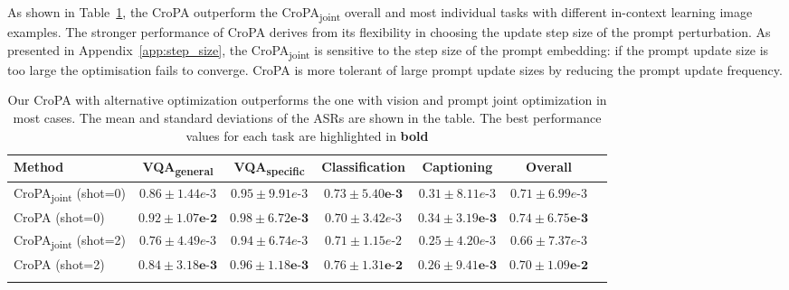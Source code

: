 As shown in Table~\ref{tab:alter_joint_comparision}, the CroPA outperform the CroPA\textsubscript{joint} overall and most individual tasks with different in-context learning image examples. The stronger performance of CroPA derives from its flexibility in choosing the update step size of the prompt perturbation. As presented in Appendix~\ref{app:step_size}, the CroPA\textsubscript{joint} is sensitive to the step size of the prompt embedding: if the prompt update size is too large the optimisation fails to converge. CroPA is more tolerant of large prompt update sizes by reducing the prompt update frequency.  

\begin{table}[ht]
\centering
\caption{Our CroPA with alternative optimization outperforms the one with vision and prompt joint optimization in most cases. The mean and standard deviations of the ASRs are shown in the table. The best performance values for each task are highlighted in \textbf{bold}} \vspace{-0.2cm}
\footnotesize
\begin{tabular}{lcccccc}
 \hline
 Method &VQA\textsubscript{general} &VQA\textsubscript{specific} &Classification &Captioning & Overall \\
 \hline
 CroPA\textsubscript{joint} (shot=0) 
 & $0.86\scriptscriptstyle \pm \scriptstyle1.44e\text{-}3$
 & $0.95\scriptscriptstyle \pm \scriptstyle9.91e\text{-}3$
 & $\mathbf{0.73\scriptscriptstyle \pm \scriptstyle5.40e\text{-}3}$
 & $0.31\scriptscriptstyle \pm \scriptstyle8.11e\text{-}3$
 & $0.71\scriptscriptstyle \pm \scriptstyle6.99e\text{-}3$ \\
 CroPA (shot=0) 
 & $\mathbf{0.92\scriptscriptstyle \pm \scriptstyle1.07e\text{-}2}$
 & $\mathbf{0.98\scriptscriptstyle \pm \scriptstyle6.72e\text{-}3}$
 & $0.70\scriptscriptstyle \pm \scriptstyle3.42e\text{-}3$
 & $\mathbf{0.34\scriptscriptstyle \pm \scriptstyle3.19e\text{-}3}$
 & $\mathbf{0.74\scriptscriptstyle \pm \scriptstyle6.75e\text{-}3}$ \\
 \hline
 CroPA\textsubscript{joint} (shot=2) 
 & $0.76\scriptscriptstyle \pm \scriptstyle4.49e\text{-}3$
 & $0.94\scriptscriptstyle \pm \scriptstyle6.74e\text{-}3$
 & $0.71\scriptscriptstyle \pm \scriptstyle1.15e\text{-}2$
 & $0.25\scriptscriptstyle \pm \scriptstyle4.20e\text{-}3$
 & $0.66\scriptscriptstyle \pm \scriptstyle7.37e\text{-}3$ \\
 CroPA (shot=2) 
 & $\mathbf{0.84\scriptscriptstyle \pm \scriptstyle3.18e\text{-}3}$
 & $\mathbf{0.96\scriptscriptstyle \pm \scriptstyle1.18e\text{-}3}$
 & $\mathbf{0.76\scriptscriptstyle \pm \scriptstyle1.31e\text{-}2}$
 & $\mathbf{0.26\scriptscriptstyle \pm \scriptstyle9.41e\text{-}3}$
 & $\mathbf{0.70\scriptscriptstyle \pm \scriptstyle1.09e\text{-}2}$ \\
 \hline
 \label{tab:alter_joint_comparision}
\end{tabular}
\end{table}

